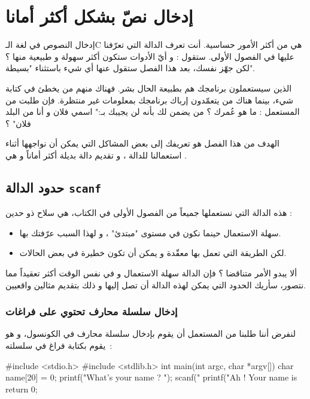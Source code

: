 \chapter{إدخال نصّ بشكل أكثر أمانا}

إدخال النصوص في لغة الـ\textenglish{C}
هي من أكثر الأمور حساسية. أنت تعرف الدالة
التي تعرّفنا عليها في الفصول الأولى. ستقول : و أيّ الأدوات ستكون أكثر سهولة و طبيعية منها ؟ لكن جهّز نفسك، بعد هذا الفصل ستقول عنها أي شيء باستثناء "بسيطة".

الذين سيستعملون برنامجك هم بطبيعة الحال بشر. فهناك منهم من يخطئ في كتابة شيء، بينما هناك من يتعمّدون إرباك برنامجك بمعلومات غير منتظرة. فإن طلبت من المستعمل : ما هو عُمرك ؟ من يضمن لك بأنه لن يجيبك بـ:" اسمي فلان و أنا من البلد فلان" ؟

الهدف من هذا الفصل هو تعريفك إلى بعض المشاكل التي يمكن أن نواجهها أثناء استعمالنا للدالة
،
و تقديم دالة بديلة أكثر أماناً و هي
.

\section{حدود الدالة \texttt{scanf}}

هذه الدالة التي نستعملها جميعاً من الفصول الأولى في الكتاب، هي سلاح ذو حدين :

\begin{itemize}
  \item سهلة الاستعمال حينما نكون في مستوى "مبتدئ" ، و لهذا السبب عرّفتك بها.
  \item لكن الطريقة التي تعمل بها معقّدة و يمكن أن تكون خطيرة في بعض الحالات.
\end{itemize}

ألا يبدو الأمر متناقضا ؟ فإن الدالة
سهلة الاستعمال و في نفس الوقت أكثر تعقيداً مما نتصور، سأريك الحدود التي يمكن لهذه الدالة أن تصل إليها و ذلك بتقديم مثالين واقعيين.

\subsection{إدخال سلسلة محارف تحتوي على فراغات }

لنفرض أننا طلبنا من المستعمل أن يقوم بإدخال سلسلة محارف في الكونسول، و هو يقوم بكتابة فراغ في سلسلته~:

\begin{Csource}
#include <stdio.h>
#include <stdlib.h>
int main(int argc, char *argv[])
{
	char name[20] = {0};
	printf("What's your name ? ");
	scanf("%
	printf("Ah ! Your name is %
	return 0;
}
\end{Csource}

